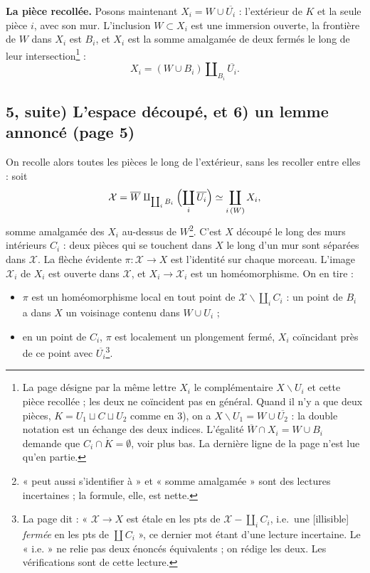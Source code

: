 \documentclass[11pt,a4paper]{article}
\begin{document}
\textbf{La pièce recollée.} Posons maintenant $X_i = W \cup \overline{U_i}$ :
l'extérieur de $K$ et la seule pièce $i$, avec son mur. L'inclusion $W \subset
X_i$ est une immersion ouverte, la frontière de $W$ dans $X_i$ est $B_i$, et
$X_i$ est la somme amalgamée de deux fermés le long de leur intersection\footnote{La page désigne par la
même lettre $X_i$ le complémentaire $X \smallsetminus U_i$ et cette pièce
recollée ; les deux ne coïncident pas en général. Quand il n'y a que deux
pièces, $K = U_1 \sqcup C \sqcup U_2$ comme en 3), on a $X \smallsetminus U_1
= W \cup \overline{U_2}$ : la double notation est un échange des deux indices.
L'égalité $\overline{W} \cap X_i = W \cup B_i$ demande que $C_i \cap \dot{K} =
\emptyset$, voir plus bas. La dernière ligne de la page n'est lue qu'en
partie.} :
\[
X_i = (W \cup B_i) \amalg_{B_i} \overline{U_i} .
\]


\subsection*{5, suite) L'espace découpé, et 6) un lemme annoncé (page 5)}

On recolle alors toutes les pièces le long de l'extérieur, sans les recoller
entre elles : soit
\[
\mathcal{X} = \overline{W} \amalg_{\coprod_i B_i} \Bigl(\coprod_i
\overline{U_i}\Bigr) \simeq \coprod_{i\,(W)} X_i ,
\]
somme amalgamée des $X_i$ au-dessus de $W$\footnote{« peut aussi s'identifier
à » et « somme amalgamée » sont des lectures incertaines ; la formule, elle,
est nette.}. C'est $X$ découpé le long des murs intérieurs $C_i$ : deux pièces
qui se touchent dans $X$ le long d'un mur sont séparées dans $\mathcal{X}$. La
flèche évidente $\pi : \mathcal{X} \to X$ est l'identité sur chaque morceau.
L'image $\mathcal{X}_i$ de $X_i$ est ouverte dans $\mathcal{X}$, et $X_i \to
\mathcal{X}_i$ est un homéomorphisme. On en tire :
\begin{itemize}
  \item $\pi$ est un homéomorphisme local en tout point de $\mathcal{X}
    \smallsetminus \coprod_i C_i$ : un point de $B_i$ a dans $X$ un voisinage
    contenu dans $W \cup U_i$ ;
  \item en un point de $C_i$, $\pi$ est localement un plongement fermé, $X_i$
    coïncidant près de ce point avec $\overline{U_i}$\footnote{La page dit :
    « $\mathcal{X} \to X$ est étale en les pts de $\mathcal{X} - \coprod_i C_i$,
    i.e.\ une [illisible] \emph{fermée} en les pts de $\coprod C_i$ », ce
    dernier mot étant d'une lecture incertaine. Le « i.e. » ne relie pas deux
    énoncés équivalents ; on rédige les deux. Les vérifications sont de cette
    lecture.}.
\end{itemize}
\end{document}
